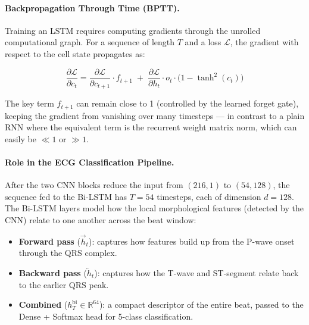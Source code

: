 \documentclass[12pt,a4paper]{article}
\begin{document}
\paragraph{Backpropagation Through Time (BPTT).}

Training an LSTM requires computing gradients through the unrolled computational
graph. For a sequence of length $T$ and a loss $\mathcal{L}$, the gradient with
respect to the cell state propagates as:

\begin{equation}
    \frac{\partial \mathcal{L}}{\partial c_{t}}
    =
    \frac{\partial \mathcal{L}}{\partial c_{t+1}}
    \cdot f_{t+1}
    \;+\;
    \frac{\partial \mathcal{L}}{\partial h_t}
    \cdot o_t \cdot \bigl(1 - \tanh^2(c_t)\bigr)
    \label{eq:bptt}
\end{equation}

\noindent The key term $f_{t+1}$ can remain close to 1 (controlled by the learned
forget gate), keeping the gradient from vanishing over many timesteps --- in
contrast to a plain RNN where the equivalent term is the recurrent weight matrix
norm, which can easily be $\ll 1$ or $\gg 1$.

\paragraph{Role in the ECG Classification Pipeline.}

After the two CNN blocks reduce the input from $(216, 1)$ to $(54, 128)$, the
sequence fed to the Bi-LSTM has $T = 54$ timesteps, each of dimension $d = 128$.
The Bi-LSTM layers model how the local morphological features (detected by the
CNN) relate to one another across the beat window:

\begin{itemize}
    \item \textbf{Forward pass} ($\overrightarrow{h}_t$): captures how
          features build up from the P-wave onset through the QRS complex.
    \item \textbf{Backward pass} ($\overleftarrow{h}_t$): captures how the
          T-wave and ST-segment relate back to the earlier QRS peak.
    \item \textbf{Combined} ($h_T^{\text{bi}} \in \mathbb{R}^{64}$): a
          compact descriptor of the entire beat, passed to the Dense + Softmax
          head for 5-class classification.
\end{itemize}
\end{document}
